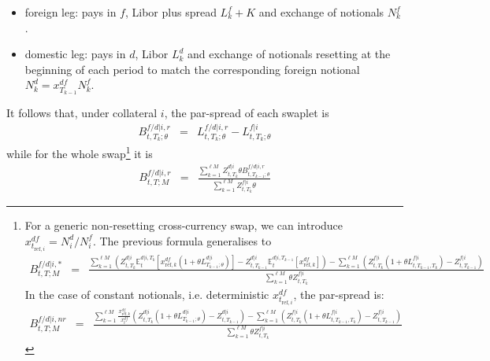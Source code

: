 \documentclass[11pt,english]{amsart}
\newcommand{\EE}{\mathbb{E}}
\newcommand{\f}{\ell}
\theoremstyle{definition}
\begin{document}
\begin{itemize}
\begin{itemize}
\item foreign leg: pays in $f$, Libor plus spread $L^{f}_k + K$ and exchange of notionals $N^f_k$.
\item domestic leg: pays in $d$, Libor $L^{d}_k$ and exchange of notionals resetting at the beginning of each period to match the corresponding foreign notional $N_k^d = x^{df}_{T_{k-1}}N_{k}^f$. 
\end{itemize}
It follows that, under collateral $i$, the par-spread of each swaplet is
\begin{eqnarray}
B^{f/d|i,r}_{t,T_{k};\theta} &=&  L^{f/d|i,r}_{t,T_{k};\theta}  -  L^{f|i}_{t,T_{k};\theta}  \label{eq:forward_cb_swaplet_resetting}
\end{eqnarray}
while for the whole swap\footnote{For a generic non-resetting cross-currency swap, we can introduce $x^{df}_{t_{\mathrm{ref},i}} = N^d_i/N^f_i$. The previous formula generalises to 
\begin{eqnarray*}
B^{f/d|i,*}_{t,T;M} &=& 
  \frac{
  \sum_{k=1}^{\f M} \left( Z^{d|i}_{t,T_k} \EE^{d|i,T_k}_t\left[ x^{df}_{\mathrm{ref},k} (1+\theta L^{d|i}_{T_{k-1};\theta})\right] - Z^{d|i}_{t,T_{k-1}} \EE^{d|i,T_{k-1}}_t\left[ x^{df}_{\mathrm{ref},k}\right] \right) - 
    \sum_{k=1}^{\f M} \left(  Z^{f|i}_{t,T_k} \left(1+\theta L^{f|i}_{t,T_{k-1},T_k} \right) - Z^{f|i}_{t,T_{k-1}} \right) }
   {\sum_{k=1}^{\f M}  \theta Z^{f|i}_{t,T_k}}
  \label{eq:forward_cb_non_resetting_generic}
\end{eqnarray*}
In the case of constant notionals, i.e. deterministic $x^{df}_{t_{\mathrm{ref},i}} $, the par-spread is: 
\begin{eqnarray*}
B^{f/d|i,nr}_{t,T;M} &=& 
  \frac{
    \sum_{k=1}^{\f M} \frac{x^{df}_{\mathrm{ref},k}}{x^{df}_t} \left( Z^{d|i}_{t,T_k} (1+\theta L^{d|i}_{T_{k-1};\theta}) - Z^{d|i}_{t,T_{k-1}} \right) - 
    \sum_{k=1}^{\f M} \left(  Z^{f|i}_{t,T_k} \left(1+\theta L^{f|i}_{t,T_{k-1},T_k} \right) - Z^{f|i}_{t,T_{k-1}} \right) }
   {\sum_{k=1}^{\f M}  \theta Z^{f|i}_{t,T_k}}
  \label{eq:forward_cb_non_resetting}
\end{eqnarray*}} 
it is 
\begin{eqnarray}
B^{f/d|i,r}_{t,T;M} &=& 
  \frac{\sum_{k=1}^{\f M} Z^{d|i}_{t,T_k} \theta B^{f/d|i,r}_{t,T_{k-1};\theta}}
   {\sum_{k=1}^{\f M}  Z^{f|i}_{t,T_k}  \theta}
  \label{eq:forward_cb_resetting}
\end{eqnarray}

\end{itemize}
\end{document}
